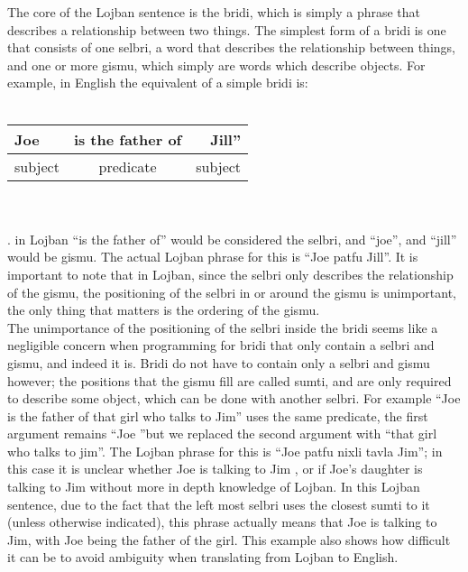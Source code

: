 \documentclass[11pt,letterpaper]{article}
\begin{document}
	The core of the Lojban sentence is the bridi, which is simply a phrase that describes a relationship between two things. The simplest form of a bridi is one that consists of one selbri, a word that describes the relationship between things, and one or more gismu, which simply are words which describe objects. For example, in English the equivalent of a simple bridi is:\\\\ 
\begin{tabular}{|l|c|r|}
Joe& is the father of &Jill”\\
\hline{}
subject&predicate&subject\\
\end{tabular}\\\\
. in Lojban “is the father of” would be considered the selbri, and “joe”, and “jill” would be gismu. The actual Lojban phrase for this is \textquotedblleft Joe patfu Jill\textquotedblright. It is important to note that in Lojban, since the selbri only describes the relationship of the gismu, the positioning of the selbri in or around the gismu is unimportant, the only thing that matters is the ordering of the gismu. \\

	The unimportance of the positioning of the selbri inside the bridi seems like a negligible concern when programming for bridi that only contain a selbri and gismu, and indeed it is. Bridi do not have to contain only a selbri and gismu however; the positions that the gismu fill are called sumti, and are only required to describe some object, which can be done with another selbri. For example “Joe is the father of that girl who talks to Jim” uses the same predicate, the first argument remains \textquotedblleft Joe \textquotedblright but we replaced the second argument with “that girl who talks to jim”. The Lojban phrase for this is “Joe patfu nixli tavla Jim”; in this case it is unclear whether Joe is talking to Jim , or if Joe's daughter is talking to Jim without more in depth knowledge of Lojban. In this Lojban sentence, due to the fact that the left most selbri uses the closest sumti to it (unless otherwise indicated), this phrase actually means that Joe is talking to Jim, with Joe being the father of the girl. This example also shows how difficult it can be to avoid ambiguity when translating from Lojban to English. \\
\end{document}
